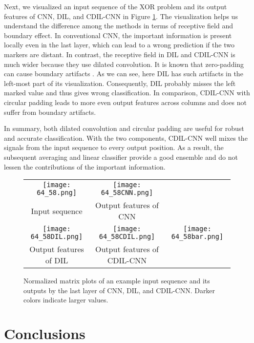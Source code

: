 \documentclass{article}
\begin{document}
Next, we visualized an input sequence of the XOR problem and its output features of CNN, DIL, and CDIL-CNN in Figure \ref{fig:feature}. The visualization helps us understand the difference among the methods in terms of receptive field and boundary effect. In conventional CNN, the important information is present locally even in the last layer, which can lead to a wrong prediction if the two markers are distant. In contrast, the receptive field in DIL and CDIL-CNN is much wider because they use dilated convolution. It is known that zero-padding can cause boundary artifacts \cite{kayhan2020translation, alsallakh2020mind}. As we can see, here DIL has such artifacts in the left-most part of its visualization. Consequently, DIL probably misses the left marked value and thus gives wrong classification. In comparison, CDIL-CNN with circular padding leads to more even output features across columns and does not suffer from boundary artifacts.

In summary, both dilated convolution and circular padding are useful for robust and accurate classification. With the two components, CDIL-CNN well mixes the signals from the input sequence to every output position. As a result, the subsequent averaging and linear classifier provide a good ensemble and do not lessen the contributions of the important information.

\begin{figure}[tb]
	\centering
	\begin{tabular}{ccc}
        \texttt{[image: 64\_58.png]} &
        \texttt{[image: 64\_58CNN.png]} &\\
        {\footnotesize Input sequence} & 
        {\footnotesize Output features of CNN} & \\
        \texttt{[image: 64\_58DIL.png]} &
        \texttt{[image: 64\_58CDIL.png]} & 
        \texttt{[image: 64\_58bar.png]} \\
        {\footnotesize Output features of DIL} & 
        {\footnotesize Output features of CDIL-CNN}& \\
    \end{tabular}
	\caption{Normalized matrix plots of an example input sequence and its outputs by the last layer of CNN, DIL, and CDIL-CNN. Darker colors indicate larger values.}
	\label{fig:feature}
\end{figure}

\section{Conclusions}
\label{sec:conclusion}
\end{document}
